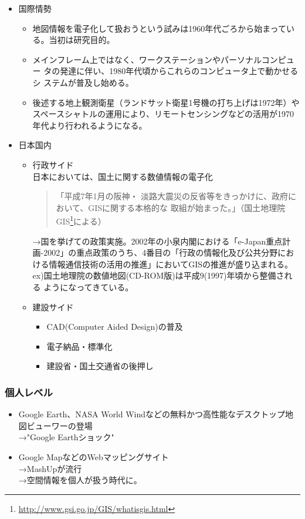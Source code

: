 \documentclass[mingoth,a4paper]{jsarticle}
\begin{document}
\begin{itemize}
 \item 国際情勢
       \begin{itemize}
	\item 地図情報を電子化して扱おうという試みは1960年代ごろから始まってい
	      る。当初は研究目的。
	\item メインフレーム上ではなく、ワークステーションやパーソナルコンピュー
	      タの発達に伴い、1980年代頃からこれらのコンピュータ上で動かせるシ
	      ステムが普及し始める。
	\item 後述する地上観測衛星（ランドサット衛星1号機の打ち上げは1972年）や
	      スペースシャトルの運用により、リモートセンシングなどの活用が1970
	      年代より行われるようになる。
       \end{itemize}
 \item 日本国内
 \begin{itemize}
  \item 行政サイド \\
	日本においては、国土に関する数値情報の電子化
	\begin{quotation}
	 「平成7年1月の阪神・
	 淡路大震災の反省等をきっかけに、政府において、GISに関する本格的な
	 取組が始まった。」（国土地理院
	 GIS\footnote{\url{http://www.gsi.go.jp/GIS/whatisgis.html}}による） 
	\end{quotation}
	→国を挙げての政策実施。2002年の小泉内閣における「e-Japan重点計
	画-2002」の重点政策のうち、4番目の「行政の情報化及び公共分野にお
	ける情報通信技術の活用の推進」においてGISの推進が盛り込まれる。
	ex)国土地理院の数値地図(CD-ROM版)は平成9(1997)年頃から整備される
	ようになってきている。
  \item 建設サイド
	\begin{itemize}
	 \item CAD(Computer Aided Design)の普及
	 \item 電子納品・標準化
	 \item 建設省・国土交通省の後押し
	\end{itemize}
 \end{itemize}
\end{itemize}

\subsubsection{個人レベル}
\begin{itemize}
 \item Google Earth、NASA World Windなどの無料かつ高性能なデスクトップ地
       図ビューワーの登場 \\
       →"Google Earthショック"
 \item Google MapなどのWebマッピングサイト \\
       →MashUpが流行\\
       →空間情報を個人が扱う時代に。
\end{itemize}
\end{document}
